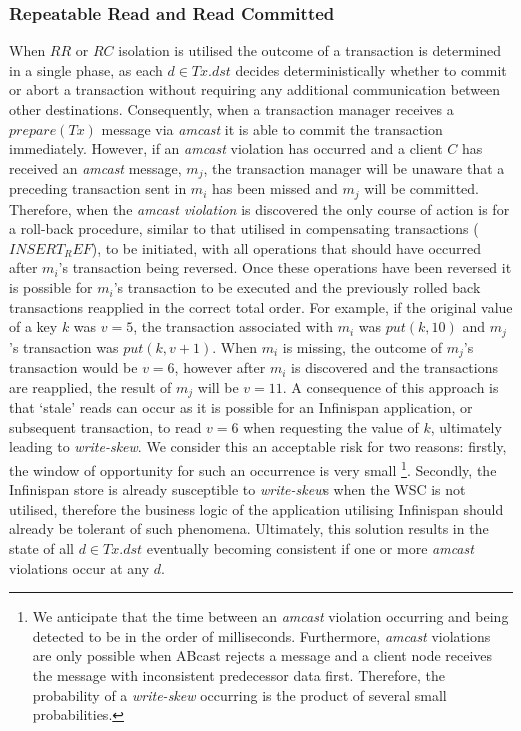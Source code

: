     \subsubsection*{Repeatable Read and Read Committed}
    When $RR$ or $RC$ isolation is utilised the outcome of a transaction is determined in a single phase, as each $d \in Tx.dst$ decides deterministically whether to commit or abort a transaction without requiring any additional communication between other destinations.  Consequently, when a transaction manager receives a $prepare(Tx)$ message via \emph{amcast} it is able to commit the transaction immediately.  However, if an \emph{amcast} violation has occurred and a client $C$ has received an \emph{amcast} message, $m_j$, the transaction manager will be unaware that a preceding transaction sent in $m_i$ has been missed and $m_j$ will be committed.  Therefore, when the \emph{amcast violation} is discovered the only course of action is for a roll-back procedure, similar to that utilised in compensating transactions ($INSERT_REF$), to be initiated, with all operations that should have occurred after $m_i$'s transaction being reversed.  Once these operations have been reversed it is possible for $m_i$'s transaction to be executed and the previously rolled back transactions reapplied in the correct total order.  For example, if the original value of a key $k$ was $v=5$, the transaction associated with $m_i$ was $put(k, 10)$ and $m_j$'s transaction was $put(k, v+1)$.  When $m_i$ is missing, the outcome of $m_j$'s transaction would be $v = 6$, however after $m_i$ is discovered and the transactions are reapplied, the result of $m_j$ will be $v = 11$.  A consequence of this approach is that \textquoteleft{}stale' reads can occur as it is possible for an Infinispan application, or subsequent transaction, to read $v = 6$ when requesting the value of $k$, ultimately leading to \emph{write-skew}.  We consider this an acceptable risk for two reasons: firstly, the window of opportunity for such an occurrence is very small \footnote{We anticipate that the time between an \emph{amcast} violation occurring and being detected to be in the order of milliseconds.  Furthermore, \emph{amcast} violations are only possible when \textsf{ABcast} rejects a message and a client node receives the message with inconsistent predecessor data first.  Therefore, the probability of a \emph{write-skew} occurring is the product of several small probabilities.}.  Secondly, the Infinispan store is already susceptible to \emph{write-skew}s when the WSC is not utilised, therefore the business logic of the application utilising Infinispan should already be tolerant of such phenomena.  Ultimately, this solution results in the state of all $d \in Tx.dst$ eventually becoming consistent if one or more \emph{amcast} violations occur at any $d$.  
    
